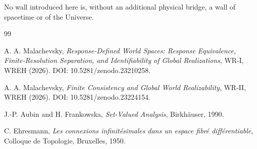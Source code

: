 \documentclass[11pt]{article}
\begin{document}
No wall introduced here is, without an additional physical bridge, a wall of
spacetime or of the Universe.

\begin{thebibliography}{99}

A. A. Malachevsky,
\emph{Response-Defined World Spaces: Response Equivalence,
Finite-Resolution Separation, and Identifiability of Global Realizations},
WR-I, WREH (2026).
DOI: 10.5281/zenodo.23210258.

A. A. Malachevsky,
\emph{Finite Consistency and Global World Realizability},
WR-II, WREH (2026).
DOI: 10.5281/zenodo.23224154.

J.-P. Aubin and H. Frankowska,
\emph{Set-Valued Analysis},
Birkh\"auser, 1990.

C. Ehresmann,
\emph{Les connexions infinit\'esimales dans un espace fibr\'e
diff\'erentiable},
Colloque de Topologie, Bruxelles, 1950.

\end{thebibliography}
\end{document}
